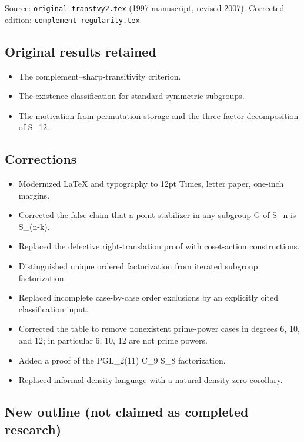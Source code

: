 \documentclass[12pt,letterpaper]{article}
\providecommand{\tightlist}{\setlength{\itemsep}{0pt}\setlength{\parskip}{0pt}}
\begin{document}
Source: \texttt{original-transtvy2.tex} (1997 manuscript, revised 2007).
Corrected edition: \texttt{complement-regularity.tex}.

\hypertarget{original-results-retained}{%
\subsection*{Original results retained}\label{original-results-retained}}

\begin{itemize}
\tightlist
\item
  The complement--sharp-transitivity criterion.
\item
  The existence classification for standard symmetric subgroups.
\item
  The motivation from permutation storage and the three-factor
  decomposition of S\_12.
\end{itemize}

\hypertarget{corrections}{%
\subsection*{Corrections}\label{corrections}}

\begin{itemize}
\tightlist
\item
  Modernized LaTeX and typography to 12pt Times, letter paper, one-inch
  margins.
\item
  Corrected the false claim that a point stabilizer in any subgroup G of
  S\_n is S\_(n-k).
\item
  Replaced the defective right-translation proof with coset-action
  constructions.
\item
  Distinguished unique ordered factorization from iterated subgroup
  factorization.
\item
  Replaced incomplete case-by-case order exclusions by an explicitly
  cited classification input.
\item
  Corrected the table to remove nonexistent prime-power cases in degrees
  6, 10, and 12; in particular 6, 10, 12 are not prime powers.
\item
  Added a proof of the PGL\_2(11) C\_9 S\_8 factorization.
\item
  Replaced informal density language with a natural-density-zero
  corollary.
\end{itemize}

\hypertarget{new-outline-not-claimed-as-completed-research}{%
\subsection*{New outline (not claimed as completed
research)}\label{new-outline-not-claimed-as-completed-research}}
\end{document}
